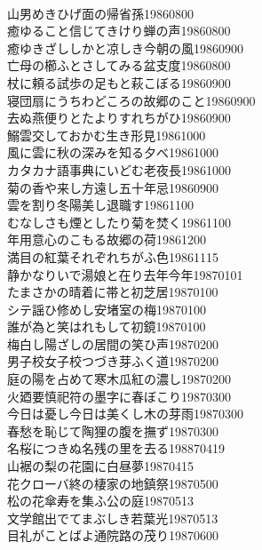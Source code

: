 \begin{multicols}{2}
\\山男めきひげ面の帰省孫\hfill{19860800}
\\癒ゆること信じてきけり蝉の声\hfill{19860800}
\\癒ゆきざししかと凉しき今朝の風\hfill{19860900}
\\亡母の櫛ふとさしてみる盆支度\hfill{19860800}
\\杖に頼る試歩の足もと萩こぼる\hfill{19860900}
\\寝団扇にうちわどころの故郷のこと\hfill{19860900}
\\去ぬ燕便りとたよりすれちがひ\hfill{19860900}
\\鰯雲交しておかむ生き形見\hfill{19861000}
\\風に雲に秋の深みを知る夕べ\hfill{19861000}
\\カタカナ語事典にいどむ老夜長\hfill{19861000}
\\菊の香や来し方遠し五十年忌\hfill{19860900}
\\雲を割り冬陽美し退職す\hfill{19861100}
\\むなしさも煙としたり菊を焚く\hfill{19861100}
\\年用意心のこもる故郷の荷\hfill{19861200}
\\満目の紅葉それぞれちがふ色\hfill{19861115}
\\静かなりいで湯娘と在り去年今年\hfill{19870101}
\\たまさかの晴着に帯と初芝居\hfill{19870100}
\\シテ謡ひ修めし安堵室の梅\hfill{19870100}
\\誰が為と笑はれもして初鏡\hfill{19870100}
\\梅白し陽ざしの居間の笑ひ声\hfill{19870200}
\\男子校女子校つづき芽ふく道\hfill{19870200}
\\庭の陽を占めて寒木瓜紅の濃し\hfill{19870200}
\\火廼要慎祀符の墨字に春ぼこり\hfill{19870300}
\\今日は憂し今日は美くし木の芽雨\hfill{19870300}
\\春愁を恥じて陶狸の腹を撫ず\hfill{19870300}
\\名桜につきぬ名残の里を去る\hfill{198870419}
\\山裾の梨の花園に白昼夢\hfill{19870415}
\\花クローバ終の棲家の地鎮祭\hfill{19870500}
\\松の花傘寿を集ふ公の庭\hfill{19870513}
\\文学館出でてまぶしき若葉光\hfill{19870513}
\\目礼がことばよ通院路の茂り\hfill{19870600}

\end{multicols}
